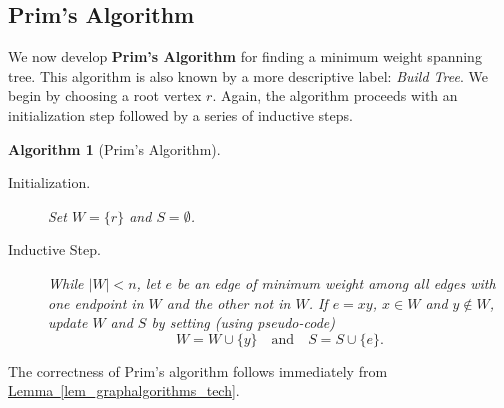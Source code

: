 \documentclass[10pt,]{book}
\newcommand{\terminology}[1]{\textbf{#1}}
\theoremstyle{plain}
\newtheorem{algorithm}[theorem]{Algorithm}
\theoremstyle{definition}
\theoremstyle{definition}
\theoremstyle{definition}
\theoremstyle{definition}
\numberwithin{equation}{section}
\newcommand{\lt}{<}
\begin{document}
\subsection[{Prim's Algorithm}]{Prim's Algorithm}\label{alg_prim}
\hypertarget{p-176}{}%
We now develop \terminology{Prim's Algorithm} for finding a minimum weight spanning tree. This algorithm is also known by a more descriptive label: \emph{Build Tree}. We begin by choosing a root vertex \(r\). Again, the algorithm proceeds with an initialization step followed by a series of inductive steps.%
\begin{algorithm}[{Prim's Algorithm}]\label{algorithm-2}
\hypertarget{p-177}{}%
\leavevmode%
\begin{description}
\item[{Initialization.}]\hypertarget{li-45}{}\hypertarget{p-178}{}%
Set \(W=\{r\}\) and \(S=\emptyset\).%
\item[{Inductive Step.}]\hypertarget{li-46}{}\hypertarget{p-179}{}%
While \(|W| \lt n\), let \(e\) be an edge of minimum weight among all edges with one endpoint in \(W\) and the other not in \(W\).  If \(e=xy\), \(x\in W\) and \(y\not\in W\), update \(W\) and \(S\) by setting (using pseudo-code)%
\begin{equation*}
W = W\cup\{y\}\quad\text{and} \quad S = S\cup\{e\}.
\end{equation*}
%
\end{description}
%
\end{algorithm}
\hypertarget{p-180}{}%
The correctness of Prim's algorithm follows immediately from \hyperref[lem_graphalgorithms_tech]{Lemma~\ref{lem_graphalgorithms_tech}}.%
\end{document}
